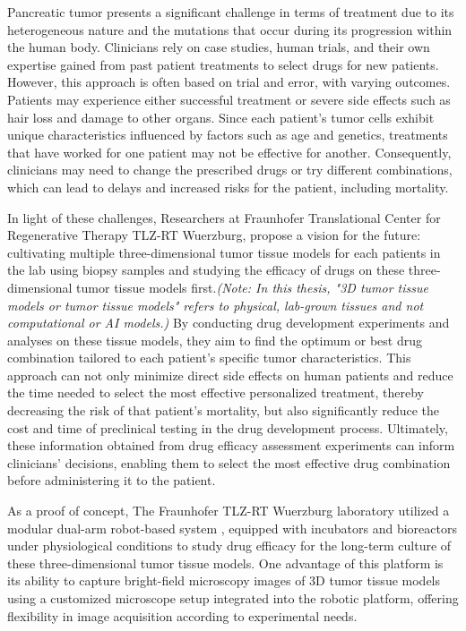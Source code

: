 \documentclass[12pt,twoside,a4paper,parskip]{scrbook} %
\begin{document}
Pancreatic tumor presents a significant challenge in terms of treatment due to its heterogeneous nature and the mutations that occur during its progression within the human body. Clinicians rely on case studies, human trials, and their own expertise gained from past patient treatments to select drugs for new patients. However, this approach is often based on trial and error, with varying outcomes. Patients may experience either successful treatment or severe side effects such as hair loss and damage to other organs. Since each patient's tumor cells exhibit unique characteristics influenced by factors such as age and genetics, treatments that have worked for one patient may not be effective for another. Consequently, clinicians may need to change the prescribed drugs or try different combinations, which can lead to delays and increased risks for the patient, including mortality.

In light of these challenges, Researchers at Fraunhofer Translational Center for Regenerative Therapy TLZ-RT Wuerzburg,  propose a vision for the future: cultivating multiple three-dimensional tumor tissue models for each patients in the lab using biopsy samples and studying the efficacy of drugs on these three-dimensional tumor tissue models first.\textit{(Note: In this thesis, "3D tumor tissue models or tumor tissue models" refers to physical, lab-grown tissues and not computational or AI models.)} By conducting drug development experiments and analyses on these tissue models, they aim to find the optimum or best drug combination tailored to each patient's specific tumor characteristics. This approach can not only minimize direct side effects on human patients and reduce the time needed to select the most effective personalized treatment, thereby decreasing the risk of that patient's mortality, but also significantly reduce the cost and time of preclinical testing in the drug development process. Ultimately, these information obtained from drug efficacy assessment experiments can inform clinicians' decisions, enabling them to select the most effective drug combination before administering it to the patient.

As a proof of concept, The Fraunhofer TLZ-RT Wuerzburg laboratory utilized a modular dual-arm robot-based system \cite{Dembski2023Establishing}, equipped with incubators and bioreactors under physiological conditions to study drug efficacy for the long-term culture of these three-dimensional tumor tissue models. One advantage of this platform is its ability to capture bright-field microscopy images of 3D tumor tissue models using a customized microscope setup integrated into the robotic platform, offering flexibility in image acquisition according to experimental needs.
\end{document}
